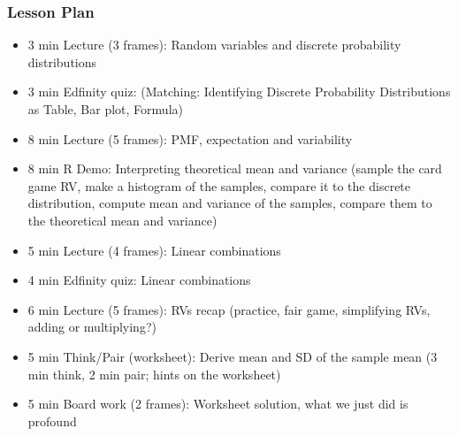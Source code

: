 \begin{frame}
    \frametitle{Lesson Plan}
    \begin{itemize}
        \item 3 min Lecture (3 frames): Random variables and discrete probability distributions
        \item 3 min Edfinity quiz: (Matching: Identifying Discrete Probability Distributions as Table, Bar plot, Formula)
        \item 8 min Lecture (5 frames): PMF, expectation and variability
        \item 8 min R Demo: Interpreting theoretical mean and variance (sample the card game RV, make a histogram of the samples, compare it to the discrete distribution, compute mean and variance of the samples, compare them to the theoretical mean and variance)
        \item 5 min Lecture (4 frames): Linear combinations
        \item 4 min Edfinity quiz: Linear combinations

        \item 6 min Lecture (5 frames): RVs recap (practice, fair game, simplifying RVs, adding or multiplying?)
        \item 5 min Think/Pair (worksheet): Derive mean and SD of the sample mean (3 min think, 2 min pair; hints on the worksheet)
        \item 5 min Board work (2 frames): Worksheet solution, what we just did is profound

    \end{itemize}
\end{frame}


